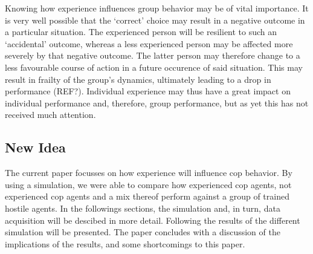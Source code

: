Knowing how experience influences group behavior may be of vital importance. It is very well possible that the `correct' choice may result in a negative outcome in a particular situation. The experienced person will be resilient to such an `accidental' outcome, whereas a less experienced person may be affected more severely by that negative outcome. The latter person may therefore change to a less favourable course of action in a future occurence of said situation. This may result in frailty of the group's dynamics, ultimately leading to a drop in performance (REF?). Individual experience may thus have a great impact on individual performance and, therefore, group performance, but as yet this has not received much attention. 

\subsection{New Idea}
The current paper focusses on how experience will influence cop behavior. By using a simulation, we were able to compare how experienced cop agents, not experienced cop agents and a mix thereof perform against a group of trained hostile agents. In the followings sections, the simulation and, in turn, data acquisition will be descibed in more detail. Following the results of the different simulation will be presented. The paper concludes with a discussion of the implications of the results, and some shortcomings to this paper. 